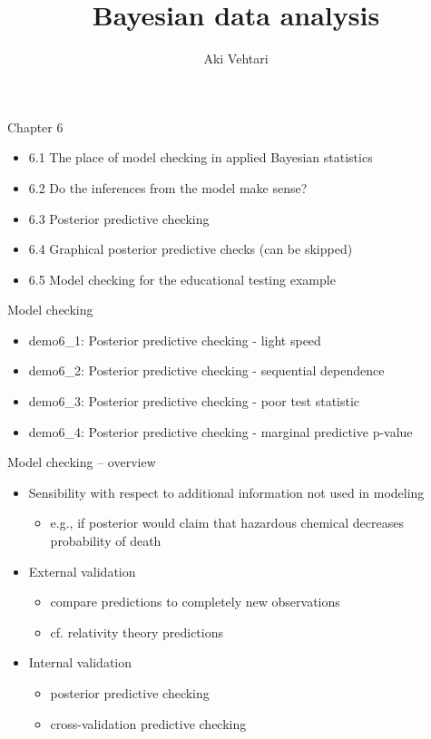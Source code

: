 \documentclass[t]{beamer}
\title[]{Bayesian data analysis}
\subtitle{}
\author{Aki Vehtari}
\institute[Aalto]{}
\begin{document}
\begin{frame}

  {\Large\color{navyblue} Chapter 6}

  \begin{itemize}
  \item 6.1 The place of model checking in applied Bayesian statistics
  \item 6.2 Do the inferences from the model make sense?
  \item 6.3 Posterior predictive checking
  \item 6.4 Graphical posterior predictive checks (can be skipped)
  \item 6.5 Model checking for the educational testing example
  \end{itemize}
  
\end{frame}

\begin{frame}
  
  {\Large\color{navyblue} Model checking}

  \begin{itemize}
  \item demo6\_1: Posterior predictive checking - light speed
  \item demo6\_2: Posterior predictive checking - sequential dependence
  \item demo6\_3: Posterior predictive checking - poor test statistic
  \item demo6\_4: Posterior predictive checking - marginal predictive p-value
  \end{itemize}

\end{frame}

 \begin{frame}

  {\Large\color{navyblue} Model checking -- overview}

  \begin{itemize}
  \item<+-> Sensibility with respect to additional information not used in modeling
    \begin{itemize}
    \item e.g., if posterior would claim that hazardous chemical
      decreases probability of death
    \end{itemize}
  \item<+-> External validation
    \begin{itemize}
    \item compare predictions to completely new observations
    \item cf. relativity theory predictions
    \end{itemize}
  \item<+-> Internal validation
    \begin{itemize}
    \item posterior predictive checking
    \item cross-validation predictive checking
    \end{itemize}
  \end{itemize}

\end{frame}
\end{document}
